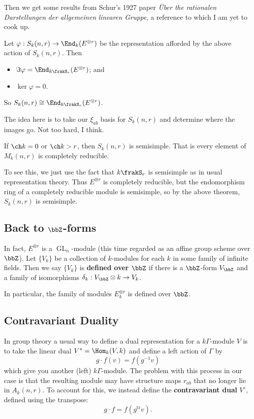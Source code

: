 \documentclass[12pt]{article}
\DeclareMathOperator{\1}{\mathbbm{1}}
\DeclareMathOperator{\GL}{GL}
\begin{document}
Then we get some results from Schur's 1927 paper \textit{\"Uber the rationalen Darstellungen der allgemeinen linearen Gruppe}, a reference to which I am yet to cook up.
\begin{thm}[Schur]
	Let $\varphi:S_k(n,r)\to \End_k(E^{\otimes r})$ be the representation afforded by the above action of $S_k(n,r)$. Then 
	\begin{itemize}
		\item $\Im \varphi=\End_{k\frakS_r}(E^{\otimes r})$; and 
		\item $\ker\varphi=0$.
	\end{itemize}
	So $S_k(n,r)\cong \End_{k\frakS_r}(E^{\otimes r})$.
\end{thm}
The idea here is to take our $\xi_{ab}$ basis for $S_k(n,r)$ and determine where the images go. Not too hard, I think.
\begin{cor}[Schur]
	If $\ch k=0$ or $\ch k>r$, then $S_k(n,r)$ is semisimple. That is every element of $M_k(n,r)$ is completely reducible.
\end{cor}
To see this, we just use the fact that $k\frakS_r$ is semisimple as in usual representation theory. Thus $E^{\otimes r}$ is 
completely reducible, but the endomorphism ring of a completely reducible module is semisimple, so by the above theorem, $S_k(n,r)$ is semisimple.

\subsection{Back to \texorpdfstring{$\bbZ$}{Z}-forms}
In fact, $E^{\otimes r}$ is a $\GL_n$-module (this time regarded as an affine group scheme over $\bbZ$). Let $\{V_k\}$ be a collection 
of $k$-modules for each $k$ in some family of infinite fields. Then we say $\{V_k\}$ is \textbf{defined over $\bbZ$} if there is a $\bbZ$-form $V_\bbZ$
and a family of isomorphisms $\delta_k:V_\bbZ\otimes k\to V_k$.

In particular, the family of modules $E^{\otimes r}_k$ is defined over $\bbZ$.

\subsection{Contravariant Duality}\label{subsec:contra}
In group theory a usual way to define a dual representation for a $k\Gamma$-module $V$ is to take the linear 
dual $V^\ast=\Hom_k(V,k)$ and define a left action of $\Gamma$ by 
\[g\cdot f(v)=f(g^{-1}v)\]
which give you another (left) $k\Gamma$-module. The problem with this process in our case is that the resulting 
module may have structure maps $r_{ab}$ that no longer lie in $A_k(n,r)$. To account for this, we instead define the 
\textbf{contravariant dual} $V^\circ$, defined using the transpose:
\[g\cdot f=f(g^{\text{tr}}v).\]
\end{document}
